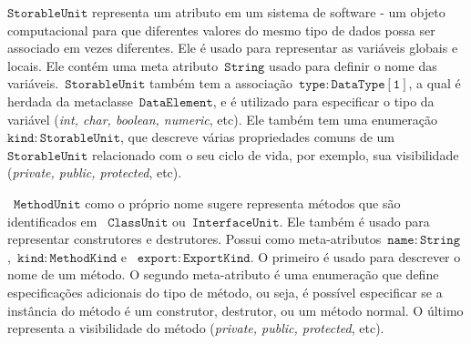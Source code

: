 $\mathtt{StorableUnit}$ representa um atributo em um sistema de software - um objeto computacional para que diferentes valores do mesmo tipo de dados possa ser associado em vezes diferentes. Ele é usado para representar as variáveis globais e locais. Ele contém uma meta atributo~$\mathtt{String}$ usado para definir o nome das variáveis.~$\mathtt{StorableUnit}$ também tem a associação~$\mathtt{type:DataType[1]}$, a qual é herdada da metaclasse~$\mathtt{DataElement}$, e é utilizado para especificar o tipo da variável (\textit{int, char, boolean, numeric}, etc). Ele também tem uma enumeração ~$\mathtt{kind:StorableUnit}$, que descreve várias propriedades comuns de um ~$\mathtt{StorableUnit}$ relacionado com o seu ciclo de vida, por exemplo, sua visibilidade (\textit{private, public, protected}, etc).


~$\mathtt{MethodUnit}$ como o próprio nome sugere representa métodos que são identificados em ~$\mathtt{ClassUnit}$ ou~$\mathtt{InterfaceUnit}$. Ele também é usado para representar construtores e destrutores. Possui como meta-atributos~$\mathtt{name:String}$,~$\mathtt{kind:MethodKind}$ e ~$\mathtt{export:ExportKind}$. O primeiro é usado para descrever o nome de um método. O segundo meta-atributo é uma enumeração que define especificações adicionais do tipo de método, ou seja, é possível especificar se a instância do método é um construtor, destrutor, ou um método normal. O último representa a visibilidade do método (\textit{private, public, protected}, etc).


